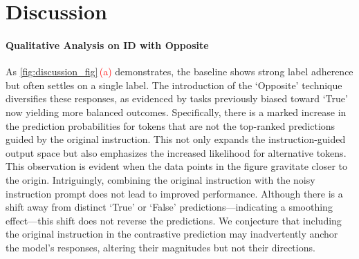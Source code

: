 
\vspace{-10pt}
\section{Discussion}
\label{sec4:discuss}

\vspace{-5pt}
\paragraph{Qualitative Analysis on ID with Opposite}
\label{sec:qualitive_analysis}

As \autoref{fig:discussion_fig}\,\textcolor{red}{(a)} demonstrates, the baseline shows strong label adherence but often settles on a single label. The introduction of the `Opposite' technique diversifies these responses, as evidenced by tasks previously biased toward `True' now yielding more balanced outcomes. Specifically, there is a marked increase in the prediction probabilities for tokens that are not the top-ranked predictions guided by the original instruction. This not only expands the instruction-guided output space but also emphasizes the increased likelihood for alternative tokens. This observation is evident when the data points in the figure gravitate closer to the origin. Intriguingly, combining the original instruction with the noisy instruction prompt does not lead to improved performance. Although there is a shift away from distinct `True' or `False' predictions—indicating a smoothing effect—this shift does not reverse the predictions. We conjecture that including the original instruction in the contrastive prediction may inadvertently anchor the model's responses, altering their magnitudes but not their directions.


